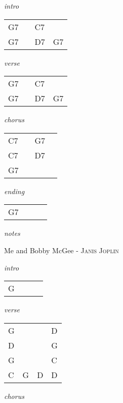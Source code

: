 \documentclass[12pt]{article}
\begin{document}
\huge
\textit{intro}

\begin{tabular}{|P{1.25in}|P{1.25in}|P{1.25in}|P{1.25in}|}
  G7 &   & C7  &   \\
  G7 &   & D7  & G7 \\
\end{tabular}

\textit{verse}

\begin{tabular}{|P{1.25in}|P{1.25in}|P{1.25in}|P{1.25in}|}
  G7 &   & C7  &   \\
  G7 &   & D7  & G7 \\
\end{tabular}

\textit{chorus}

\begin{tabular}{|P{1.25in}|P{1.25in}|P{1.25in}|P{1.25in}|}
  C7 &   &  G7 &   \\
  C7 &   &  D7 &   \\
  G7 &   &     &   \\
\end{tabular}

\textit{ending}

\begin{tabular}{|P{1.25in}|P{1.25in}|P{1.25in}|P{1.25in}|}
  G7 &   &   &   \\
\end{tabular}

\textit{notes}

\newpage

{\Huge Me and Bobby McGee} {\huge - \textsc{Janis Joplin}}

\huge
\textit{intro}

\begin{tabular}{|P{1.25in}|P{1.25in}|P{1.25in}|P{1.25in}|}
  G &   &   &   \\
\end{tabular}

\textit{verse}

\begin{tabular}{|P{1.25in}|P{1.25in}|P{1.25in}|P{1.25in}|}
  G &   &   &  D \\
  D &   &   &  G \\
  G &   &   &  C \\
  C & G & D &  D \\ 
\end{tabular}

\textit{chorus}
\end{document}
